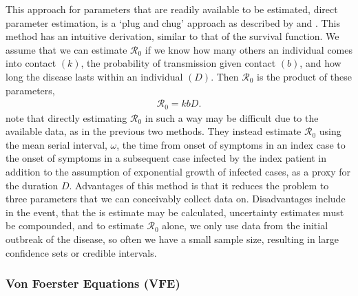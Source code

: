 \documentclass[12pt]{article}
\newcommand{\rr}{\ensuremath{\mathcal{R}_0}}
\begin{document}
This approach for parameters that are readily available to be estimated, direct parameter estimation, is a `plug and chug' approach as described by \cite{lipsitch2003} and \cite{dietz1993estimation}.  This method has an intuitive derivation, similar to that of the survival function.  We assume that we can estimate $\rr$ if we know how many others an individual comes into contact $(k)$, the probability of transmission given contact $(b)$, and how long the disease lasts within an individual $(D)$.  Then $\rr$ is the product of these parameters, 
\begin{align}\label{eq:dpe}
\rr = kbD.
\end{align}
\cite{lipsitch2003} note that directly estimating $\rr$ in such a way may be difficult due to the available data, as in the previous two methods.  They instead estimate $\rr$ using the mean serial interval, $\omega$, the time from onset of symptoms in an index case to the onset of symptoms in a subsequent case infected by the index patient in addition to the assumption of exponential growth of infected cases, as a proxy for the duration $D$.  Advantages of this method is that it reduces the problem to three parameters that we can conceivably collect data on.  Disadvantages include in the event, that the is estimate may be calculated, uncertainty estimates must be compounded, and to estimate $\rr$ alone, we only use data from the initial outbreak of the disease, so often we have a small sample size, resulting in large confidence sets or credible intervals.



\subsubsection{Von Foerster Equations (VFE)}
\label{sec:direct-estim-surv}
\end{document}
